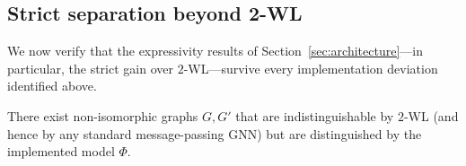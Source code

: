 \subsection{Strict separation beyond 2-WL}

We now verify that the expressivity results of Section~\ref{sec:architecture}---in particular, the strict gain over $2$-WL---survive every implementation deviation identified above.

\begin{corollary}
\label{cor:impl_strict}
There exist non-isomorphic graphs $G, G'$ that are indistinguishable by $2$-WL (and hence by any standard message-passing GNN) but are distinguished by the implemented model $\Phi$.
\end{corollary}

